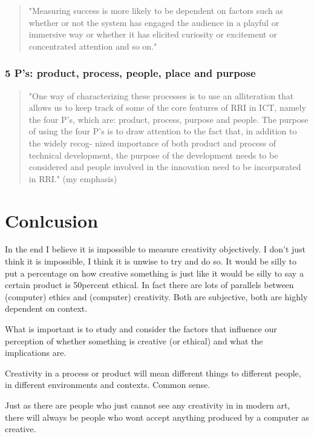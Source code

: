 \begin{quote}
"Measuring success is more likely to be dependent on factors such as whether or not the system has engaged the audience in a playful or immersive way or whether it has elicited curiosity or excitement or concentrated attention and so on." \citep[p.23]{Candy2012}
\end{quote}

\subsubsection{5 P’s: product, process, people, place and purpose}

\begin{quote}
"One way of characterizing these processes is to use an alliteration that allows us to keep track of some of the core features of RRI in ICT, namely the four P's, which are: product, process, purpose and people. The purpose of using the four P's is to draw attention to the fact that, in addition to the widely recog- nized importance of both product and process of technical development, the purpose of the development needs to be considered and people involved in the innovation need to be incorporated in RRI." \citep[p.203]{Stahl2013} (my emphasis)
\end{quote}

\section{Conlcusion}

\begin{draft}
In the end I believe it is impossible to measure creativity objectively. I don’t just think it is impossible, I think it is unwise to try and do so. It would be silly to put a percentage on how creative something is just like it would be silly to say a certain product is 50percent ethical. In fact there are lots of parallels between (computer) ethics and (computer) creativity. Both are subjective, both are highly dependent on context.

What is important is to study and consider the factors that influence our perception of whether something is creative (or ethical) and what the implications are.

Creativity in a process or product will mean different things to different people, in different environments and contexts.
Common sense.

Just as there are people who just cannot see any creativity in in modern art, there will always be people who wont accept anything produced by a computer as creative.
\end{draft}

